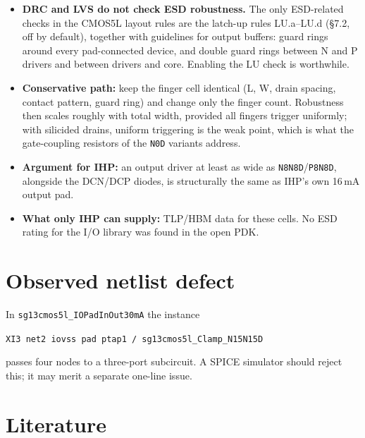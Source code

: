 \documentclass[11pt,a4paper]{article}
\newcommand{\cell}[1]{\texttt{#1}}
\begin{document}
\begin{itemize}
  \item \textbf{DRC and LVS do not check ESD robustness.} The only ESD-related
        checks in the CMOS5L layout rules are the latch-up rules LU.a--LU.d
        (\S7.2, off by default), together with guidelines for output buffers:
        guard rings around every pad-connected device, and double guard rings
        between N and P drivers and between drivers and core. Enabling the LU
        check is worthwhile.
  \item \textbf{Conservative path:} keep the finger cell identical (L, W, drain
        spacing, contact pattern, guard ring) and change only the finger
        count. Robustness then scales roughly with total width, provided all
        fingers trigger uniformly; with silicided drains, uniform triggering is
        the weak point, which is what the gate-coupling resistors of the
        \cell{N0D} variants address.
  \item \textbf{Argument for IHP:} an output driver at least as wide as
        \cell{N8N8D}/\cell{P8N8D}, alongside the DCN/DCP diodes, is structurally
        the same as IHP's own 16\,mA output pad.
  \item \textbf{What only IHP can supply:} TLP/HBM data for these cells. No ESD
        rating for the I/O library was found in the open PDK.
\end{itemize}

\section{Observed netlist defect}

In \cell{sg13cmos5l\_IOPadInOut30mA} the instance
\begin{center}
\cell{XI3 net2 iovss pad ptap1 / sg13cmos5l\_Clamp\_N15N15D}
\end{center}
passes four nodes to a three-port subcircuit. A SPICE simulator should reject
this; it may merit a separate one-line issue.

\section{Literature}
\end{document}
